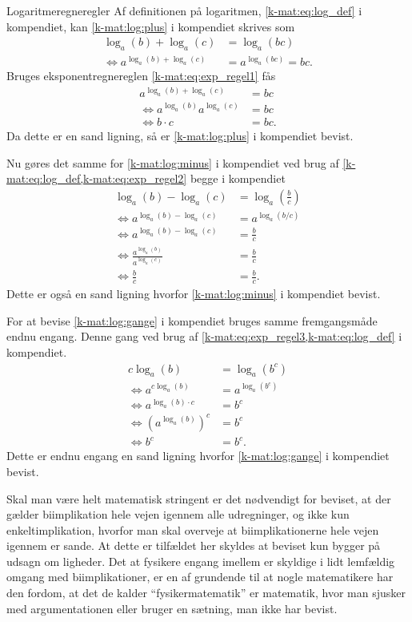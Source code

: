 \begin{opgave}[4]{Logaritmeregneregler}
Af definitionen på logaritmen, \cref{k-mat:eq:log_def} i kompendiet, kan \cref{k-mat:log:plus} i kompendiet skrives som
%
\begin{align*}
    \log_a(b) + \log_a(c) &= \log_a(bc) \\
    \iff a^{\log_a(b) + \log_a(c)} &= a^{\log_a(bc)} = bc.
\end{align*}
%
Bruges eksponentregnereglen \cref{k-mat:eq:exp_regel1} fås
%
\begin{align*}
    a^{\log_a(b) + \log_a(c)} &=  bc \\
    \iff a^{\log_a(b)} a^{\log_a(c)} &= bc \\
    \iff b \cdot c &= bc.
\end{align*}
%
Da dette er en sand ligning, så er \cref{k-mat:log:plus} i kompendiet bevist.

Nu gøres det samme for \cref{k-mat:log:minus} i kompendiet ved brug af \cref{k-mat:eq:log_def,k-mat:eq:exp_regel2} begge i kompendiet
%
\begin{align*}
    \log_a(b) - \log_a(c) &= \log_a\left(\frac{b}{c}\right) \\
    \iff a^{\log_a(b) - \log_a(c)} &= a^{\log_a(b/c)} \\
    \iff a^{\log_a(b) - \log_a(c)} &=  \frac{b}{c} \\
    \iff \frac{a^{\log_a(b)}}{a^{\log_a(c)}} &= \frac{b}{c} \\
    \iff \frac{b}{c} &= \frac{b}{c}.
\end{align*}
%
Dette er også en sand ligning hvorfor \cref{k-mat:log:minus} i kompendiet bevist.

For at bevise \cref{k-mat:log:gange} i kompendiet bruges samme fremgangsmåde endnu engang. Denne gang ved brug af \cref{k-mat:eq:exp_regel3,k-mat:eq:log_def} i kompendiet.
%
\begin{align*}
    c\log_a(b) &= \log_a(b^c) \\
    \iff a^{c\log_a(b)} &= a^{\log_a(b^c)} \\
    \iff a^{\log_a(b) \cdot c} &= b^c \\
    \iff \left( a^{\log_a(b)} \right)^c &= b^c \\
    \iff b^c &= b^c.
\end{align*}
%
Dette er endnu engang en sand ligning hvorfor \cref{k-mat:log:gange} i kompendiet bevist.

Skal man være helt matematisk stringent er det nødvendigt for beviset, at der gælder biimplikation hele vejen igennem alle udregninger, og ikke kun enkeltimplikation, hvorfor man skal overveje at biimplikationerne hele vejen igennem er sande. At dette er tilfældet her skyldes at beviset kun bygger på udsagn om ligheder. Det at fysikere engang imellem er skyldige i lidt lemfældig omgang med biimplikationer, er en af grundende til at nogle matematikere har den fordom, at det de kalder ``fysikermatematik'' er matematik, hvor man sjusker med argumentationen eller bruger en sætning, man ikke har bevist.
\end{opgave}